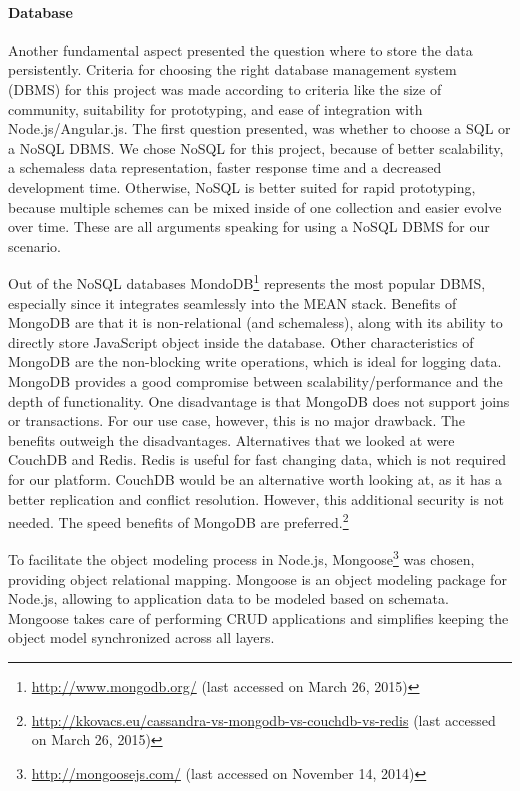 	\paragraph{Database}

		Another fundamental aspect presented the question where to store the data persistently. Criteria for choosing the right database management system (DBMS) for this project was made according to criteria like the size of community, suitability for prototyping, and ease of integration with Node.js/Angular.js. The first question presented, was whether to choose a SQL or a NoSQL DBMS. We chose NoSQL for this project, because of better scalability, a schemaless data representation, faster response time and a decreased development time\cite{vaish2013getting}. Otherwise, NoSQL is better suited for rapid prototyping, because multiple schemes can be mixed inside of one collection and easier evolve over time. These are all arguments speaking for using a NoSQL DBMS for our scenario. 

		Out of the NoSQL databases MondoDB\footnote{\url{http://www.mongodb.org/} (last accessed on March 26, 2015)} represents the most popular DBMS, especially since it integrates seamlessly into the MEAN stack. Benefits of MongoDB are that it is non-relational (and schemaless), along with its ability to directly store JavaScript object inside the database. Other characteristics of MongoDB are the non-blocking write operations, which is ideal for logging data. MongoDB provides a good compromise between scalability/performance and the depth of functionality. One disadvantage is that MongoDB does not support joins or transactions. For our use case, however, this is no major drawback. The benefits outweigh the disadvantages. Alternatives that we looked at were CouchDB and Redis. Redis is useful for fast changing data, which is not required for our platform. CouchDB would be an alternative worth looking at, as it has a better replication and conflict resolution. However, this additional security is not needed. The speed benefits of MongoDB are preferred.\footnote{\url{http://kkovacs.eu/cassandra-vs-mongodb-vs-couchdb-vs-redis} (last accessed on March 26, 2015)}
		
		To facilitate the object modeling process in Node.js, Mongoose\footnote{\url{http://mongoosejs.com/} (last accessed on November 14, 2014)} was chosen, providing object relational mapping. Mongoose is an object modeling package for Node.js, allowing to application data to be modeled based on schemata. Mongoose takes care of performing CRUD applications and simplifies keeping the object model synchronized across all layers.


